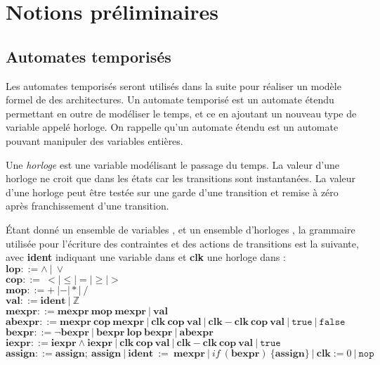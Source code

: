 \section{Notions pr\'eliminaires}

\subsection{Automates temporis\'es}
\label{fr:sec:formal_methods}
Les automates temporisés seront utilisés dans la suite pour réaliser un modèle formel de
des architectures.
Un automate temporisé est un automate étendu permettant en outre de modéliser le temps, et ce
en ajoutant un nouveau type de variable appelé horloge. On rappelle qu'un automate étendu est un automate
pouvant manipuler des variables entières.


\begin{definition}[Horloges]
  Une \textit{horloge} est une variable modélisant le passage du temps.
  La valeur d'une horloge ne croit que dans les états car les transitions sont instantanées.
  La valeur d'une horloge peut être testée sur une garde d'une transition et remise à zéro après franchissement d'une transition.
\end{definition}


\begin{definition}
\label{fr:def:formal_methods:transition_grammar2}
Étant donné un ensemble de variables \automatavariables{}, et un ensemble
d'horloges \automataclocks{}, la grammaire utilisée pour l'écriture des
contraintes et des actions de transitions est la suivante, avec \textbf{ident}
indiquant une variable dans \automatavariables{} et \textbf{clk} une horloge
dans \automataclocks{}:\\
$\textbf{lop} ::= \land~|~\lor $\\
$\textbf{cop} ::=\!\!\! ~< | \le | = | \ge | > $\\
$\textbf{mop} ::= +~| - | * |~/$\\
$
\textbf{val} ::=
   \textbf{ident}
   ~|~ \mathbb{Z}
$\\
$\textbf{mexpr} ::=
   \textbf{mexpr}~\textbf{mop}~\textbf{mexpr}
   ~|~ \textbf{val}
$\\
$
\textbf{abexpr} ::=
   \textbf{mexpr}~\textbf{cop}~\textbf{mexpr}
   ~|~ \textbf{clk}~\textbf{cop}~\textbf{val}
   ~|~ \textbf{clk} - \textbf{clk}~\textbf{cop}~\textbf{val}
   ~|~ \texttt{true}
   ~|~ \texttt{false}
$\\
$
\textbf{bexpr} ::=
   \neg \textbf{bexpr}
   ~|~ \textbf{bexpr}~\textbf{lop}~\textbf{bexpr}
   ~|~ \textbf{abexpr}
$\\
$\textbf{iexpr} ::=
   \textbf{iexpr} \land \textbf{iexpr}
   ~|~ \textbf{clk}~\textbf{cop}~\textbf{val}
   ~|~ \textbf{clk} - \textbf{clk}~\textbf{cop}~\textbf{val}
   ~|~ \texttt{true}
$\\
$
\textbf{assign} ::=
   \textbf{assign};~\textbf{assign}
   ~|~ \textbf{ident}~:=~\textbf{mexpr}
   ~|~ if~(\textbf{bexpr})~\{\textbf{assign}\}
   ~|~ \textbf{clk} := 0
   ~|~ \texttt{nop}
$
\end{definition}



